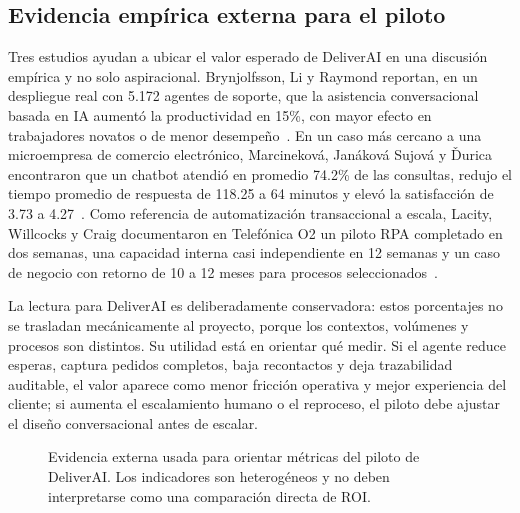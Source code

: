 \subsection{Evidencia empírica externa para el piloto}

Tres estudios ayudan a ubicar el valor esperado de DeliverAI en una discusión empírica y no solo aspiracional. Brynjolfsson, Li y Raymond reportan, en un despliegue real con 5.172 agentes de soporte, que la asistencia conversacional basada en IA aumentó la productividad en 15\%, con mayor efecto en trabajadores novatos o de menor desempeño~\cite{brynjolfsson2025}. En un caso más cercano a una microempresa de comercio electrónico, Marcineková, Janáková Sujová y Ďurica encontraron que un chatbot atendió en promedio 74.2\% de las consultas, redujo el tiempo promedio de respuesta de 118.25 a 64 minutos y elevó la satisfacción de 3.73 a 4.27~\cite{marcinekova2025}. Como referencia de automatización transaccional a escala, Lacity, Willcocks y Craig documentaron en Telefónica O2 un piloto RPA completado en dos semanas, una capacidad interna casi independiente en 12 semanas y un caso de negocio con retorno de 10 a 12 meses para procesos seleccionados~\cite{lacity2015}.

La lectura para DeliverAI es deliberadamente conservadora: estos porcentajes no se trasladan mecánicamente al proyecto, porque los contextos, volúmenes y procesos son distintos. Su utilidad está en orientar qué medir. Si el agente reduce esperas, captura pedidos completos, baja recontactos y deja trazabilidad auditable, el valor aparece como menor fricción operativa y mejor experiencia del cliente; si aumenta el escalamiento humano o el reproceso, el piloto debe ajustar el diseño conversacional antes de escalar.

\begin{figure}[htbp]
\centering
{}
\caption{Evidencia externa usada para orientar métricas del piloto de DeliverAI\@. Los indicadores son heterogéneos y no deben interpretarse como una comparación directa de ROI.}%
\label{fig:evidencia_automatizacion}
\end{figure}

